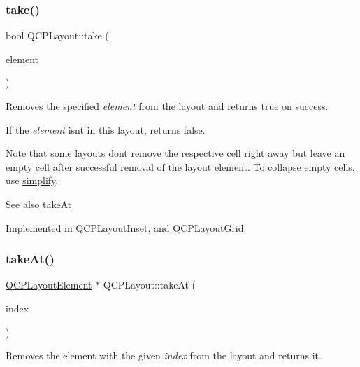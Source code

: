 \subsubsection{\texorpdfstring{take()}{take()}}
{\footnotesize\ttfamily bool Q\+C\+P\+Layout\+::take (\begin{DoxyParamCaption}\item[{\hyperlink{class_q_c_p_layout_element}{Q\+C\+P\+Layout\+Element} $\ast$}]{element }\end{DoxyParamCaption})\hspace{0.3cm}{\ttfamily [pure virtual]}}

Removes the specified {\itshape element} from the layout and returns true on success.

If the {\itshape element} isn\textquotesingle{}t in this layout, returns false.

Note that some layouts don\textquotesingle{}t remove the respective cell right away but leave an empty cell after successful removal of the layout element. To collapse empty cells, use \hyperlink{class_q_c_p_layout_a41e6ac049143866e8f8b4964efab01b2}{simplify}.

\begin{DoxySeeAlso}{See also}
\hyperlink{class_q_c_p_layout_a5a79621fa0a6eabb8b520cfc04fb601a}{take\+At} 
\end{DoxySeeAlso}


Implemented in \hyperlink{class_q_c_p_layout_inset_af7f13cc369f8190b5e7e17d5f39dfe1c}{Q\+C\+P\+Layout\+Inset}, and \hyperlink{class_q_c_p_layout_grid_aee961c2eb6cf8a85dcbc5a7d7b6c1a00}{Q\+C\+P\+Layout\+Grid}.

\mbox{\label{class_q_c_p_layout_a5a79621fa0a6eabb8b520cfc04fb601a}} 
\subsubsection{\texorpdfstring{take\+At()}{takeAt()}}
{\footnotesize\ttfamily \hyperlink{class_q_c_p_layout_element}{Q\+C\+P\+Layout\+Element} $\ast$ Q\+C\+P\+Layout\+::take\+At (\begin{DoxyParamCaption}\item[{int}]{index }\end{DoxyParamCaption})\hspace{0.3cm}{\ttfamily [pure virtual]}}

Removes the element with the given {\itshape index} from the layout and returns it.

